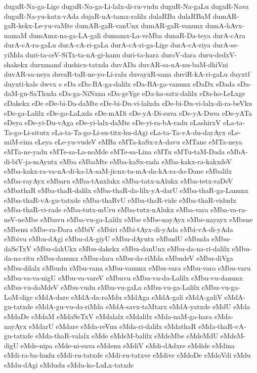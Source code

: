 {duguR-Na-ga-Lige
duguR-Na-ga-Li-lalx-di-ru-vudu
duguR-Na-gaLu
duguR-Nava
duguR-Na-yu-katx-vAda
dujaR-nA-tamx-ralilx
dulaRBa
dulaRBaM
dumAR-gaR-kekx-Le-yu-vaMte
dumAR-gaR-vanUnx
dumAR-gaR-vanunx
dumA-hAvx-namaM
dumAmx-na-ga-LA-gali
dumamx-La-veMba
dunaR-Da-teya
durA-cAra
durA-cA-ra-gaLu
durA-cA-ri-gaLa
durA-cA-ri-ga-Lige
durA-cA-riya
durA-se-yiMda
duri-ta-ceV-SiTx-ta-nA-gi-hanu
duri-ta-hara
duroV-dara
duru-dedxV-shakekx
durxmamf
dushicx-tatxda
duvADa
duvAR-sa-nA-nu-baM-dhiVni
duvAR-sa-neya
duvaR-taR-ne-yo-Li-ralu
duvayxR-sana
duviR-kA-ri-gaLu
duyxtf
duyxti-kale
dwvx
e
eDa
eDa-BA-ga-dalilx
eDa-BA-ga-vanunx
eDaDx
eDada
eDa-daM-gu-SaThxda
eDa-ga-NiNxna
eDa-geYge
eDa-ha-satx-dalilx
eDa-ho-LeLxge
eDakekx
eDe
eDe-bi-Da-daMte
eDe-bi-Du-vi-lalxda
eDe-bi-Du-vi-lalx-di-ra-beVku
eDe-ga-Lalilx
eDe-go-LaLxda
eDe-mADi
eDe-yA-Di-suva
eDe-yA-Duva
eDe-yATa
eDeya
eDe-yi-Du-vAga
eDe-yi-lalx-daMte
eDe-yi-ra-bA-radu
eLashirxV
eLa-ta-Ta-go-Li-situtx
eLa-ta-Ta-go-Li-su-titx-hu-dAgi
eLa-ta-Ta-vA-du-dayAyx
eLe-miM-cina
eLeya
eLe-yu-vudeV
eMBa
eMTa-kaSx-rA-davu
eMTane
eMTa-neya
eMTa-ne-yadu
eMTe-sa-La-noMde
eMTe-sa-Lina
eMTu
eMTu-taM-Dada
eMbA-di-biV-ja-mAyutx
eMba
eMbaMte
eMba-kaSx-rada
eMba-kakx-ra-kakxdeV
eMba-kakx-ra-va-nA-di-ka-lA-saM-jicnx-ta-mA-da-kA-ra-do-Dane
eMbalilx
eMba-rayAyx
eMbaru
eMba-tAnxlukx
eMba-tatx-nAlukx
eMba-tetx-raDeV
eMbathaR
eMba-thaR-dalilx
eMba-thaR-da-lilx-yA-darU
eMba-thaR-ga-Lanunx
eMba-thaR-vA-gu-tatxde
eMba-thaRvU
eMba-thaR-vide
eMba-thaR-vidudx
eMba-thaR-vi-rade
eMba-tutx-mUru
eMba-tutx-nAlukx
eMba-vara
eMba-va-ra-neV-neMbe
eMbavu
eMba-vu-ga-Lalilx
eMbe
eMbe-nayAyx
eMbe-nayayx
eMbene
eMbenu
eMbe-ra-Dara
eMbiV
eMbiri
eMbi-tAyx-di-yAda
eMbi-vA-di-yAda
eMbivu
eMbu-dAgi
eMbu-dA-giyU
eMbu-dAyutx
eMbudU
eMbuda
eMbu-daSeTxV
eMbu-dakUkx
eMbu-dakekx
eMbu-danUnx
eMbu-da-na-ri-dalilx
eMbu-da-na-ritu
eMbu-danunx
eMbu-dara
eMbu-da-riMda
eMbudeV
eMbu-diVga
eMbu-dilalx
eMbudu
eMbu-vana
eMbu-vanunx
eMbu-vara
eMbu-varo
eMbu-varu
eMbu-va-va-nigU
eMbu-va-vareV
eMbuvu
eMbu-vu-da-Lalilx
eMbu-vu-danunx
eMbu-vu-doMdeV
eMbu-vudu
eMbu-vu-gaLa
eMbu-vu-ga-Lalilx
eMbu-vu-ga-LoM-dige
eMdA-dare
eMdA-da-roMdu
eMdAga
eMdA-gali
eMdA-galiV
eMdA-gu-tatxde
eMdA-gu-vu-da-riMda
eMdA-savx-taMtarx
eMdA-yatxde
eMdU
eMda
eMdaDe
eMdaM
eMdaSeTxV
eMdalalx
eMdalilx
eMda-naM-ga-hara
eMda-nayAyx
eMdarU
eMdare
eMda-reVnu
eMda-ri-dalilx
eMdathaR
eMda-thaR-vA-gu-tatxde
eMda-thaR-valalx
eMde
eMdeM-balilx
eMdeMbe
eMdeMdU
eMdeM-digU
eMde-nipa
eMde-ni-suva
eMdenu
eMdiV
eMdi-dAdxre
eMdide
eMdina
eMdi-ra-ba-hudu
eMdi-ru-tatxde
eMdi-ru-tatxve
eMdive
eMdoDe
eMdoVdi
eMdu
eMdu-dAgi
eMdudu
eMdu-ko-LuLx-tatxde
}
